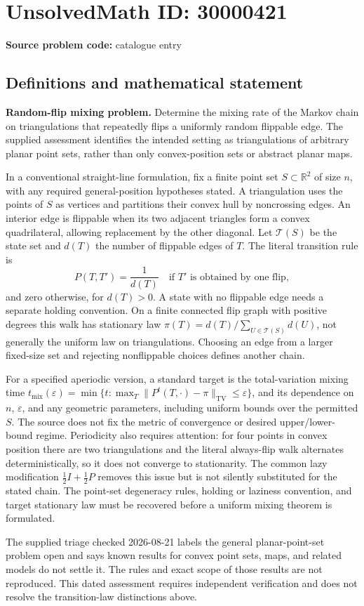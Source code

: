 \documentclass[11pt]{article}
\newcommand{\R}{\mathbb{R}}
\begin{document}
\section*{UnsolvedMath ID: 30000421}
\textbf{Source problem code:} catalogue entry
\subsection{Definitions and mathematical statement}
\textbf{Random-flip mixing problem.} Determine the mixing rate of the Markov chain on triangulations that repeatedly flips a uniformly random flippable edge. The supplied assessment identifies the intended setting as triangulations of arbitrary planar point sets, rather than only convex-position sets or abstract planar maps.\par In a conventional straight-line formulation, fix a finite point set \(S\subset\R^2\) of size \(n\), with any required general-position hypotheses stated. A triangulation uses the points of \(S\) as vertices and partitions their convex hull by noncrossing edges. An interior edge is flippable when its two adjacent triangles form a convex quadrilateral, allowing replacement by the other diagonal. Let \(\mathcal T(S)\) be the state set and \(d(T)\) the number of flippable edges of \(T\). The literal transition rule is\[P(T,T')=\frac1{d(T)}\quad\text{if }T'\text{ is obtained by one flip},\] and zero otherwise, for \(d(T)>0\). A state with no flippable edge needs a separate holding convention. On a finite connected flip graph with positive degrees this walk has stationary law \(\pi(T)=d(T)/\sum_{U\in\mathcal T(S)}d(U)\), not generally the uniform law on triangulations. Choosing an edge from a larger fixed-size set and rejecting nonflippable choices defines another chain.\par For a specified aperiodic version, a standard target is the total-variation mixing time \(t_{\mathrm{mix}}(\varepsilon)=\min\{t:\max_T\|P^t(T,\cdot)-\pi\|_{\mathrm{TV}}\le\varepsilon\}\), and its dependence on \(n\), \(\varepsilon\), and any geometric parameters, including uniform bounds over the permitted \(S\). The source does not fix the metric of convergence or desired upper/lower-bound regime. Periodicity also requires attention: for four points in convex position there are two triangulations and the literal always-flip walk alternates deterministically, so it does not converge to stationarity. The common lazy modification \(\frac12I+\frac12P\) removes this issue but is not silently substituted for the stated chain. The point-set degeneracy rules, holding or laziness convention, and target stationary law must be recovered before a uniform mixing theorem is formulated.\par The supplied triage checked 2026-08-21 labels the general planar-point-set problem open and says known results for convex point sets, maps, and related models do not settle it. The rules and exact scope of those results are not reproduced. This dated assessment requires independent verification and does not resolve the transition-law distinctions above.
\end{document}

